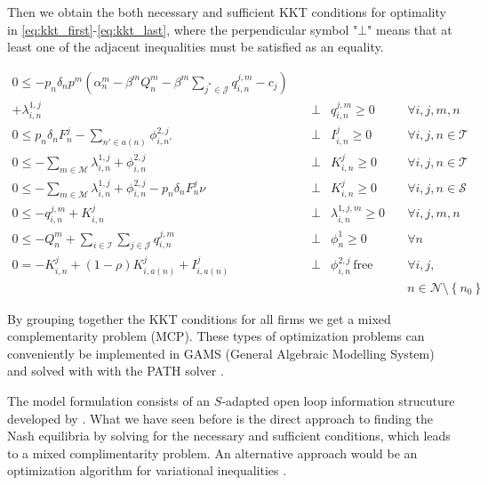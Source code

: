 Then we obtain the both necessary and sufficient KKT conditions for optimality in \eqref{eq:kkt_first}-\eqref{eq:kkt_last}, where the perpendicular symbol "$\bot$" means that at least one of the adjacent inequalities must be satisfied as an equality.


\begin{align}
0\leq - p_n\delta_np^m\left(\alpha_n^m-\beta^m Q_n^m-\beta^m\sum_{j^*\in \mathcal{J}}q_{i,n}^{j,m}-c_j\right) \nonumber\\
+\lambda_{i,n}^{1,j} &\quad\bot&q_{i,n}^{j,m}\geq 0&  \quad \forall i,j,m,n\label{eq:kkt_first}\\
0\leq p_n\delta_nF_n^{j} - \sum_{n'\in a(n)}\phi_{i,n'}^{2,j} &\quad\bot&I_{i,n}^{j}\geq 0&  \quad \forall i,j,n\in\mathcal{T}\\
0 \leq -\sum_{m\in\mathcal{M}}\lambda_{i,n}^{1,j}  +\phi_{i,n}^{2,j} &\quad\bot&K_{i,n}^{j}\geq 0&  \quad \forall i,j,n\in\mathcal{T}\\
0 \leq -\sum_{m\in\mathcal{M}}\lambda_{i,n}^{1,j}  +\phi_{i,n}^{2,j}-p_n\delta_nF_n^j\nu &\quad\bot&K_{i,n}^{j}\geq 0&  \quad \forall i,j,n\in\mathcal{S}\\
0\leq -q_{i,n}^{j,m} + K_{i,n}^{j} &\quad\bot&\lambda_{i,n}^{1,j,m}\geq 0&  \quad \forall i,j,m,n\\
0 \leq -Q_n^m+\sum_{i\in \mathcal{I}}\sum_{j\in \mathcal{J}} q_{i,n}^{j,m} &\quad\bot&\phi_{n}^{1}\geq 0&  \quad \forall n\\
0 = -K_{i,n}^{j} + (1-\rho)K_{i,a(n)}^{j}+I_{i,a(n)}^{j} &\quad\bot& \phi_{i,n}^{2,j}\,\mbox{free} & \quad \forall i,j,\nonumber\\
&&& \quad n\in\mathcal{N}\setminus \left\{n_0\right\}\label{eq:kkt_last}
\end{align}

By grouping together the KKT conditions for all firms we get a mixed complementarity problem (MCP). These types of optimization problems can conveniently be implemented in GAMS (General Algebraic Modelling System) and solved with with the PATH solver \citep[see][]{Ferris2000}.

The model formulation consists of an $S$-adapted open loop information strucuture developed by \cite{Haurie1990}. What we have seen before is the direct approach to finding the Nash equilibria by solving for the necessary and sufficient conditions, which leads to a mixed complimentarity problem. An alternative approach would be an optimization algorithm for variational inequalities \citep[see e.g.][]{Haurie2002, Pineau2003}.


